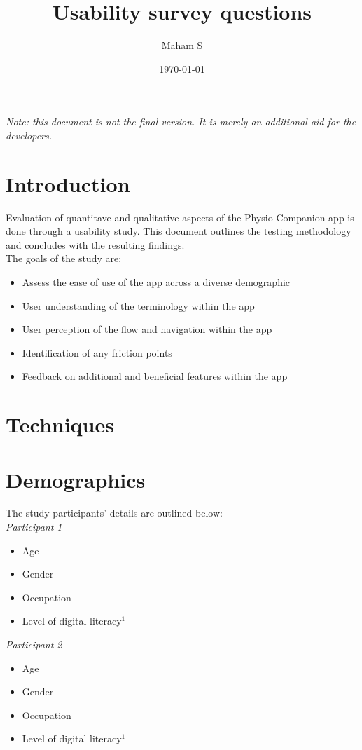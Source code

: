 \documentclass{article}
\title{Usability survey questions}
\author{Maham S}
\date{\today}
\begin{document}
\maketitle
\newpage
\tableofcontents
\newpage
\textit{Note: this document is not the final version. It is merely an additional aid for the developers.}

\section{Introduction}
Evaluation of quantitave and qualitative aspects of the Physio Companion app is done through a usability study.
This document outlines the testing methodology and concludes with the resulting findings. \\
The goals of the study are: 
\begin{itemize}
    \item Assess the ease of use of the app across a diverse demographic
    \item User understanding of the terminology within the app
    \item User perception of the flow and navigation within the app
    \item Identification of any friction points 
    \item Feedback on additional and beneficial features within the app
\end{itemize}

\section{Techniques}

\section{Demographics}
The study participants' details are outlined below: \\

\textit{Participant 1}
\begin{itemize}
    \item Age
    \item Gender
    \item Occupation
    \item Level of digital literacy$^1$
\end{itemize}

\textit{Participant 2}
\begin{itemize}
    \item Age
    \item Gender
    \item Occupation
    \item Level of digital literacy$^1$
\end{itemize}
\end{document}
